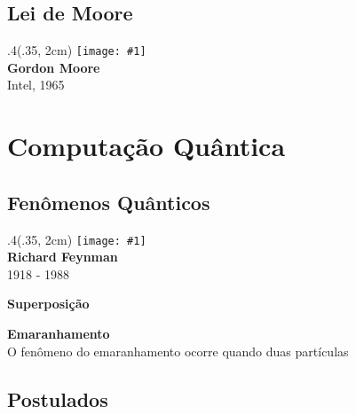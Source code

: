 \documentclass[t]{beamer}
\newcommand{\ket}[1]{\ensuremath{\left|#1\right\rangle}}
\newcommand{\comicfinal}[1]{
	\bgroup
	\usebackgroundtemplate{\texttt{[image: \#1]}}
	\begin{frame}[plain]{}

	\end{frame}
	\egroup
}
\newcommand{\person}[6]{%
\begin{textblock*}{#4}(#5, #6)
	\texttt{[image: \#1]}\\
	\textbf{#2}\\
	{\small #3}
\end{textblock*}
}
\DeclareRobustCommand{\mychar}[1]{%
  \begingroup\normalfont
  \texttt{[image: \#1]}%
  \endgroup
}
\begin{document}
		
	\subsection{Lei de Moore}
	
	\begin{frame}{\subsecname}
		\person{moore.jpg}{Gordon Moore}{Intel, 1965}{.4\paperwidth}{.35\paperwidth}{2cm}
	\end{frame}
	
	\comicfinal{moores-law.pdf}

	\section{Computação Quântica}
	
	\subsection{Fenômenos Quânticos}
	
	\begin{frame}{\subsecname}
		\person{feynman.jpg}{Richard Feynman}{1918 - 1988}{.4\paperwidth}{.35\paperwidth}{2cm}
	\end{frame}
	
	\begin{frame}{\subsecname}
		\textbf{Superposição}\\
		\vspace{2cm}
		\begin{overprint}
			\onslide<+>\resizebox{\textwidth}{!}{%
				$$\ket{\Psi} = \ket{\phantom{\Psi}} + \ket{\phantom{\Psi}}$$
			}%
			\onslide<+>\resizebox{\textwidth}{!}{%
				$$\ket{\Psi} = \ket{\uparrow} + \ket{\downarrow}$$
			}%
			\onslide<+>\resizebox{\textwidth}{!}{%
				$$\ket{\Psi} = \ket{\mychar{cara.pdf}} + \ket{\mychar{coroa.pdf}}$$
			}%
			\onslide<+>\resizebox{\textwidth}{!}{%
				$$\ket{\Psi} = \ket{\mychar{alive-cat.pdf}} + \ket{\mychar{dead-cat.pdf}}$$
			}%
			\onslide<+>\resizebox{\textwidth}{!}{%
				$$\ket{\Psi} = \ket{0} + \ket{1}$$
			}%
		\end{overprint}
	\end{frame}	
	
	\begin{frame}{\subsecname}
		\textbf{Emaranhamento}\\
		
		O fenômeno do emaranhamento ocorre quando duas partículas 
	\end{frame}		
	
	\subsection{Postulados}
	
\end{document}

